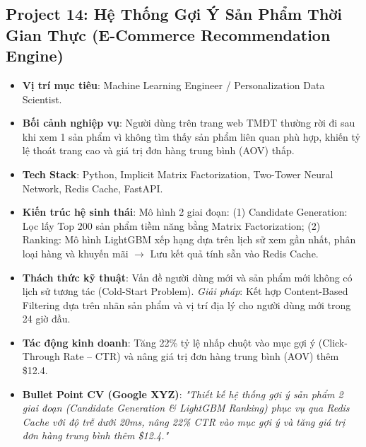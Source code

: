 \subsection{Project 14: Hệ Thống Gợi Ý Sản Phẩm Thời Gian Thực (E-Commerce Recommendation Engine)}
\begin{itemize}
    \item \textbf{Vị trí mục tiêu}: Machine Learning Engineer / Personalization Data Scientist.
    \item \textbf{Bối cảnh nghiệp vụ}: Người dùng trên trang web TMĐT thường rời đi sau khi xem 1 sản phẩm vì không tìm thấy sản phẩm liên quan phù hợp, khiến tỷ lệ thoát trang cao và giá trị đơn hàng trung bình (AOV) thấp.
    \item \textbf{Tech Stack}: Python, Implicit Matrix Factorization, Two-Tower Neural Network, Redis Cache, FastAPI.
    \item \textbf{Kiến trúc hệ sinh thái}: Mô hình 2 giai đoạn: (1) Candidate Generation: Lọc lấy Top 200 sản phẩm tiềm năng bằng Matrix Factorization; (2) Ranking: Mô hình LightGBM xếp hạng dựa trên lịch sử xem gần nhất, phân loại hàng và khuyến mãi $\rightarrow$ Lưu kết quả tính sẵn vào Redis Cache.
    \item \textbf{Thách thức kỹ thuật}: Vấn đề người dùng mới và sản phẩm mới không có lịch sử tương tác (Cold-Start Problem). \textit{Giải pháp}: Kết hợp Content-Based Filtering dựa trên nhãn sản phẩm và vị trí địa lý cho người dùng mới trong 24 giờ đầu.
    \item \textbf{Tác động kinh doanh}: Tăng 22\% tỷ lệ nhấp chuột vào mục gợi ý (Click-Through Rate -- CTR) và nâng giá trị đơn hàng trung bình (AOV) thêm \$12.4.
    \item \textbf{Bullet Point CV (Google XYZ)}: \textit{"Thiết kế hệ thống gợi ý sản phẩm 2 giai đoạn (Candidate Generation \& LightGBM Ranking) phục vụ qua Redis Cache với độ trễ dưới 20ms, nâng 22\% CTR vào mục gợi ý và tăng giá trị đơn hàng trung bình thêm \$12.4."}
\end{itemize}

